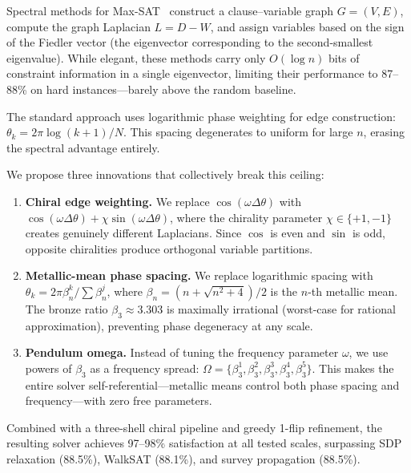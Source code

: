 \documentclass[11pt,a4paper]{article}
\begin{document}
Spectral methods for Max-SAT~\cite{alaoui2014spectral} construct a
clause--variable graph $G = (V, E)$, compute the graph Laplacian
$L = D - W$, and assign variables based on the sign of the Fiedler
vector (the eigenvector corresponding to the second-smallest eigenvalue).
While elegant, these methods carry only $O(\log n)$ bits of constraint
information in a single eigenvector, limiting their performance to
87--88\% on hard instances---barely above the random baseline.

The standard approach uses logarithmic phase weighting for edge
construction: $\theta_k = 2\pi \log(k+1)/N$. This spacing degenerates
to uniform for large $n$, erasing the spectral advantage entirely.

We propose three innovations that collectively break this ceiling:

\begin{enumerate}[leftmargin=*]
\item \textbf{Chiral edge weighting.} We replace $\cos(\omega\Delta\theta)$
  with $\cos(\omega\Delta\theta) + \chi\sin(\omega\Delta\theta)$, where
  the chirality parameter $\chi \in \{+1, -1\}$ creates genuinely
  different Laplacians. Since $\cos$ is even and $\sin$ is odd, opposite
  chiralities produce orthogonal variable partitions.

\item \textbf{Metallic-mean phase spacing.} We replace logarithmic
  spacing with $\theta_k = 2\pi\beta_n^k / \sum\beta_n^j$, where
  $\beta_n = (n + \sqrt{n^2+4})/2$ is the $n$-th metallic mean.
  The bronze ratio $\beta_3 \approx 3.303$ is maximally irrational
  (worst-case for rational approximation), preventing phase degeneracy
  at any scale.

\item \textbf{Pendulum omega.} Instead of tuning the frequency
  parameter $\omega$, we use powers of $\beta_3$ as a frequency
  spread: $\Omega = \{\beta_3^1, \beta_3^2, \beta_3^3, \beta_3^4,
  \beta_3^5\}$. This makes the entire solver self-referential---metallic
  means control both phase spacing and frequency---with zero free
  parameters.
\end{enumerate}

Combined with a three-shell chiral pipeline and greedy 1-flip
refinement, the resulting solver achieves 97--98\% satisfaction at all
tested scales, surpassing SDP relaxation (88.5\%), WalkSAT (88.1\%),
and survey propagation (88.5\%).

\end{document}
